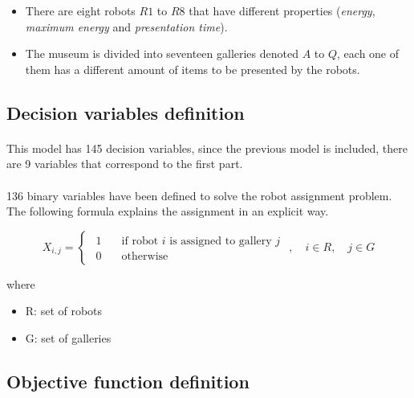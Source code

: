 \begin{itemize}
    \item There are eight robots $R1$ to $R8$ that have different properties (\textit{energy}, \textit{maximum energy} and \textit{presentation time}).
    \item The museum is divided into seventeen galleries denoted $A$ to $Q$, each one of them has a different amount of items to be presented by the robots.
    
\end{itemize}




\subsection{Decision variables definition}

\paragraph{}
This model has 145 decision variables, since the previous model is included, there are 9 variables that correspond to the first part.
\paragraph{}
136 binary variables have been defined to solve the robot assignment problem. The following formula explains the assignment in an explicit way.


\begin{equation}
X_{i,j} =
\left \{
      \begin{matrix}
      \begin{aligned}
         1& \quad \text{if robot $i$ is assigned to gallery $j$}\\
         0& \quad \text{otherwise}
      \end{aligned}
      \end{matrix}
   \right .
   , \quad i \in R, \quad j \in G
\end{equation}


where

\begin{itemize}
    \item[] R: set of robots
    \item[] G: set of galleries
\end{itemize}


\subsection{Objective function definition}

